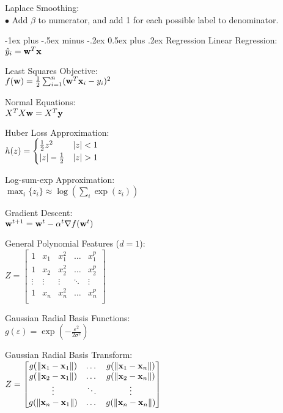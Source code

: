 \documentclass[12pt,landscape]{article}
\makeatletter
\renewcommand{\section}{\@startsection{section}{1}{0mm}%
                                {-1ex plus -.5ex minus -.2ex}%
                                {0.5ex plus .2ex}%
                                {\normalfont\normalsize\bfseries}}
\newcommand{\tab}{\hspace*{1em}}
\newcommand{\ds}{\displaystyle}
\renewcommand{\grad}{\nabla}
\theoremstyle{definition}
\makeatother
\begin{document}
\begin{multicols}{3}
Laplace Smoothing:\\
\tab $\bullet$ Add $\beta$ to numerator, and add 1 for each possible label to denominator.

\section{Regression}
Linear Regression:\\
\tab $\hat{y}_i = \vb{w}^T\vb{x}$

Least Squares Objective:\\
\tab $f(\vb{w}) = \frac{1}{2}\sum_{i=1}^{n}(\vb{w}^T\vb{x}_i - y_i)^2$

Normal Equations:\\
\tab $X^TX\vb{w} = X^T\vb{y}$

Huber Loss Approximation:\\
\tab $h(z) = \begin{cases}
	\frac{1}{2}z^2 & \abs{z} < 1\\
	\abs{z} - \frac{1}{2} & \abs{z} > 1
\end{cases}$

Log-sum-exp Approximation:\\
\tab $\max_i\{z_i\} \approx \log\left(\sum_{i}\exp(z_i)\right)$

\columnbreak
Gradient Descent:\\
\tab $\vb{w}^{t+1} = \vb{w}^t - \alpha^t\grad{f(\vb{w}^t)}$

General Polynomial Features ($d = 1$):\\
\tab $\ds Z = \begin{bmatrix}
	1 & x_1 & x_1^2 & \dots & x_1^p \\
	1 & x_2 & x_2^2 & \dots & x_2^p \\
	\vdots & \vdots & \vdots & \ddots & \vdots \\
	1 & x_n & x_n^2 & \dots & x_n^p \\
\end{bmatrix}$

Gaussian Radial Basis Functions:\\
\tab $\ds g(\varepsilon) = \exp(-\frac{\varepsilon^2}{2\sigma^2})$

Gaussian Radial Basis Transform:\\
\tab $\ds Z = \begin{bmatrix}
	g(\norm{\vb{x}_1 - \vb{x}_1}) & \dots & g(\norm{\vb{x}_1 - \vb{x}_n}) \\
	g(\norm{\vb{x}_2 - \vb{x}_1}) &  \dots & g(\norm{\vb{x}_2 - \vb{x}_n}) \\
	\vdots & \ddots & \vdots \\
	g(\norm{\vb{x}_n - \vb{x}_1}) &  \dots & g(\norm{\vb{x}_n - \vb{x}_n}) \\
\end{bmatrix}$


\end{multicols}
\end{document}
